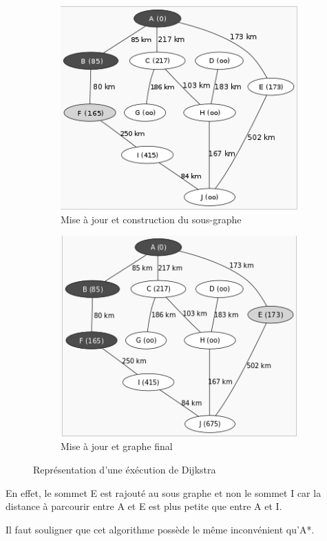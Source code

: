 \begin{figure}[h!]
\begin{subfigure}[h!]{0.4\textwidth}
                \includegraphics[width=\textwidth]{dijk2.png}
                \caption{Mise à jour et construction du sous-graphe}
        \end{subfigure}

        \begin{subfigure}[h!]{0.4\textwidth}
                \includegraphics[width=\textwidth]{dijk3.png}
                \caption{Mise à jour et graphe final}
        \end{subfigure}
        \caption{\label{fig:dijkstra}Représentation d'une éxécution de Dijkstra \cite{wikiDijkstra}}
\end{figure}


En effet, le sommet E est rajouté au sous graphe et non le sommet I car la distance à parcourir entre A et E est plus petite que entre A et I.

Il faut souligner que cet algorithme possède le même inconvénient qu'A*. 